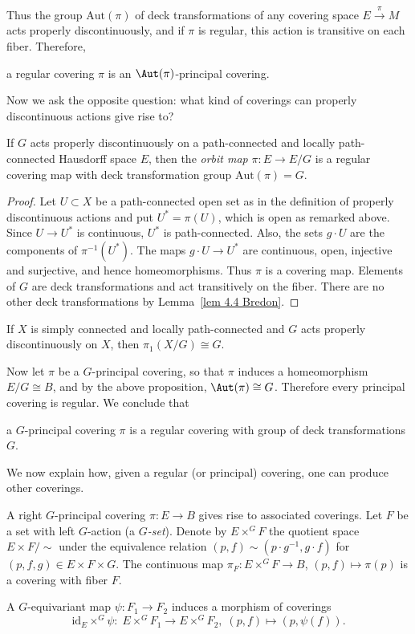 Thus the group $\mathrm{Aut}(\pi)$ of deck transformations of any covering space $E\overset{\pi}{\to}M$ acts properly discontinuously, and if $\pi$ is regular, this action is transitive on each fiber. Therefore,
\begin{center}
    a regular covering $\pi$ is an $\Aut(\pi)$-principal covering.
\end{center}

Now we ask the opposite question: what kind of coverings can properly discontinuous actions give rise to?

\begin{prop}
    If $G$ acts properly discontinuously on a path-connected and locally path-connected Hausdorff space $E$, then the \emph{orbit map} $\pi:E\to E\slash G$ is a regular covering map with deck transformation group $\mathrm{Aut}(\pi)=G$.
\end{prop}
\begin{proof}
    Let $U\subset X$ be a path-connected open set as in the definition of properly discontinuous actions and put $U^\ast =\pi(U)$, which is open as remarked above. Since $U\to U^\ast$ is continuous, $U^\ast$ is path-connected. Also, the sets $g\cdot U$ are the components of $\pi^{-1}(U^\ast)$. The maps $g\cdot U\to U^\ast$ are continuous, open, injective and surjective, and hence homeomorphisms. Thus $\pi$ is a covering map. Elements of $G$ are deck transformations and act transitively on the fiber. There are no other deck transformations by Lemma~\ref{lem 4.4 Bredon}.
\end{proof}
\begin{cor}
    If $X$ is simply connected and locally path-connected and $G$ acts properly discontinuously on $X$, then $\pi_1(X\slash G)\cong G$.
\end{cor}


Now let $\pi$ be a $G$-principal covering, so that $\pi$ induces a homeomorphism $E\slash G\cong B$, and by the above proposition, $\Aut(\pi)\cong G$. Therefore every principal covering is regular. We conclude that 
\begin{center}
    a $G$-principal covering $\pi$ is a regular covering with group of deck transformations $G$.
\end{center}


We now explain how, given a regular (or principal) covering, one can produce other coverings.

\begin{defn}
    A right $G$-principal covering $\pi:E\to B$ gives rise to associated coverings. Let $F$ be a set with left $G$-action (a \emph{$G$-set}). Denote by $E\times^G F$ the quotient space $E\times F\slash \sim $ under the equivalence relation $(p,f)\sim(p\cdot g^{-1},g\cdot f)$ for $(p,f,g)\in E\times F\times G$. The continuous map $\pi_F:E\times^G F\to B$, $(p,f)\mapsto \pi(p)$ is a covering with fiber $F$.

    A $G$-equivariant map $\psi:F_1\to F_2$ induces a morphism of coverings
    \[\mathrm{id}_E\times^G\psi: \; E\times^G F_1\to E \times^G F_2,\; (p,f)\mapsto (p,\psi(f)).\]
\end{defn}

